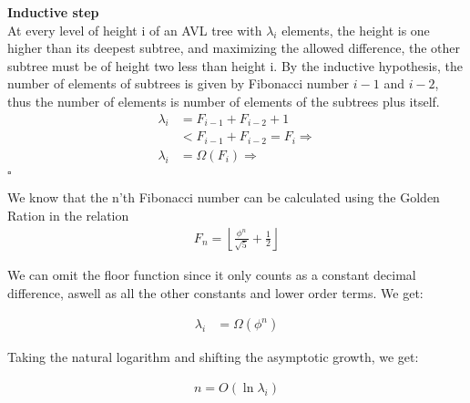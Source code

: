 \documentclass[11pt,english]{article}
\begin{document}
\textbf{Inductive step}\\[5pt]

\noindent
At every level of height i of an AVL tree with $\lambda_i$ elements, the height 
is one higher than its deepest subtree, and maximizing the allowed difference,
the other subtree must be of height two less than height i. By the inductive 
hypothesis, the number of elements of subtrees is given by Fibonacci number $i-1$
and $i-2$, thus the number of elements is number of elements of the subtrees plus
itself.
\begin{align*}
\lambda_i &= F_{i-1} + F_{i-2} + 1 \\
          &< F_{i-1} + F_{i-2} = F_i \Rightarrow \\
          \lambda_i &= \Omega (F_i) \Rightarrow \\
\end{align*}
\hfill $\square$

We know that the n'th Fibonacci number can be calculated using the Golden Ration
in the relation \\

\begin{align*}
F_n =  \left\lfloor \frac{\phi^n}{\sqrt{5}} + \frac{1}{2} \right\rfloor
\end{align*}

We can omit the floor function since it only counts as a constant decimal 
difference, aswell as all the other constants and lower order terms. We get:

\begin{align*}
\lambda_i &= \Omega \left( \phi^n \right)
\end{align*}

\noindent
Taking the natural logarithm and shifting the asymptotic growth, we get:

\begin{align*}
n = O(\ln \lambda_i)
\end{align*}
\end{document}
